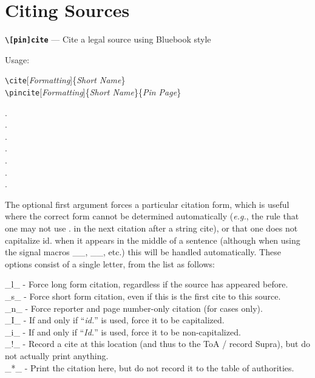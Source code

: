 \section{Citing Sources}

\noindent\texttt{\large\bf\textbackslash{}[pin]cite} --- Cite a legal source using Bluebook style

\noindent Usage: 

 \texttt{\textbackslash{}cite}[\textit{Formatting}]\{\textit{Short Name}\} \\
 \hspace*{\parindent}\texttt{\textbackslash{}pincite}[\textit{Formatting}]\{\textit{Short Name}\}\{\textit{Pin Page}\} 

 \begin{Example}
   \cite[l]{Marbury}. \\ 
   . \\
   . \\
   . \\
   . \\
   \See {}. \\
   \Cf {}.
 \end{Example}
	 
 \noindent The optional first argument forces a particular citation form, which is useful where the correct form cannot be determined automatically
 (\textit{e.g.}, the rule that one may not use \Id. in the next citation after a string cite), or that one does not capitalize id. 
 when it appears in the middle of a sentence (although when using the signal macros _\See_, _\Seealso_, etc.) this will be
 handled automatically. These options consist of a single letter, from the list as follows:  

 \noindent
	_l_ - Force long form citation, regardless if the source has appeared before. \\
	_s_ - Force short form citation, even if this is the first cite to this source. \\
	_n_ - Force reporter and page number-only citation (for cases only). \\
	_I_ - If and only if ``\textit{id.}'' is used, force it to be capitalized. \\ 
	_i_ - If and only if ``\textit{Id.}'' is used, force it to be non-capitalized. \\
	_!_ - Record a cite at this location (and thus to the ToA / record Supra), but do not actually print anything. \\ 
	_*_ - Print the citation here, but do not record it to the table of authorities.  


